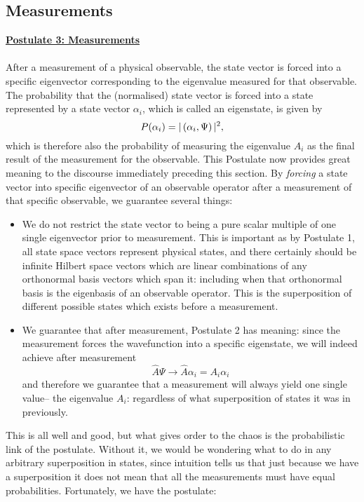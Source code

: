 \subsection{Measurements}
\Answer
\underline{\textbf{Postulate 3: Measurements}}\\\\
After a measurement of a physical observable, the state vector is forced into a specific eigenvector corresponding to the eigenvalue measured for that observable. The probability that the (normalised) state vector is forced into a state represented by a state vector $\alpha_{i}$, which is called an eigenstate, is given by
$$
P(\alpha_{i})=|\left(\alpha_{i},\Psi\right)|^2,
$$
which is therefore also the probability of measuring the eigenvalue $A_{i}$ as the final result of the measurement for the observable.
\Answerend
This Postulate now provides great meaning to the discourse immediately preceding this section. By \textit{forcing} a state vector into specific eigenvector of an observable operator after a measurement of that specific observable, we guarantee several things:
\begin{itemize}
    \item We do not restrict the state vector to being a pure scalar multiple of one single eigenvector prior to measurement. This is important as by Postulate 1, all state space vectors represent physical states, and there certainly should be infinite Hilbert space vectors which are linear combinations of any orthonormal basis vectors which span it: including when that orthonormal basis is the eigenbasis of an observable operator. This is the superposition of different possible states which exists before a measurement.
    \item We guarantee that after measurement, Postulate 2 has meaning: since the measurement forces the wavefunction into a specific eigenstate, we will indeed achieve after measurement
    $$
    \hat{A}\Psi\to \hat{A}\alpha_{i}=A_{i}\alpha_{i}
    $$
    and therefore we guarantee that a measurement will always yield one single value-- the eigenvalue $A_{i}$: regardless of what superposition of states it was in previously. 
\end{itemize}
This is all well and good, but what gives order to the chaos is the probabilistic link of the postulate. Without it, we would be wondering what to do in any arbitrary superposition in states, since intuition tells us that just because we have a superposition it does not mean that all the measurements must have equal probabilities. Fortunately, we have the postulate:
